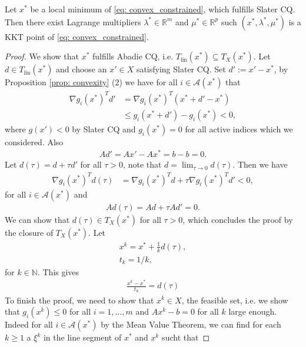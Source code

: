 \begin{theorem}
    Let $ x^{*} $ be a local minimum of \ref{eq: convex_constrained}, which
    fulfills Slater CQ. Then there exist Lagrange multipliers $\lambda^{*}
    \in \mathbb{R}^{m}$ and $\mu^{*} \in \mathbb{R}^{p}$  such
    $(x^{*},\lambda^{*},\mu^{*})$ is a KKT point of \ref{eq:
    convex_constrained}.
\end{theorem}
\begin{proof}
We show that $x^{*}$ fulfills Abadie CQ, i.e. $T_{\text{lin}}(x^{*})
\subseteq T_X(x^{*})$. Let $d \in T_{\text{lin}}(x^{*})$ and choose an $x'
\in X$ satisfying Slater CQ. Set $d' := x' - x^{*}$, by Proposition
\ref{prop: convexity} (2) we have for all $i \in \mathcal{A}(x^{*})$ that
\begin{align}
    \nabla g_i(x^{*})^{T} d'
    &= \nabla g_i(x^{*})^{T} (x^{*} + d' - x^{*} )\\
    &\le g_i(x^{*} +d') -g_i(x^{*}) < 0,
\end{align}
where $g(x') < 0$ by Slater CQ and $g_i(x^{*}) = 0$ for all active indices
which we considered. Also
\begin{align}
    Ad' = Ax' - Ax^{*} = b - b = 0.
\end{align}
Let $d(\tau) = d+ \tau d'$ for all $\tau >0$, note that $d = \lim_{\tau \to
0}d(\tau)$. Then we have
\begin{align}
    \nabla g_i(x^{*})^{T} d(\tau)
    &= \nabla g_i (x^{*})^{T} d + \tau \nabla g_i(x^{*})^{T} d' < 0,
\end{align}
for all $i \in \mathcal{A}(x^{*})$ and
\begin{align}
    Ad(\tau) = Ad + \tau Ad' = 0.
\end{align}
We can show that $d(\tau) \in T_X(x^{*})$ for all $\tau >0 $, which concludes
the proof by the closure of $T_X(x^{*})$. Let
\begin{align}
    x^{k}  = x^{*} + \frac{1}{k}d(\tau),\\
    t_k = 1/k,
\end{align}
for $k \in \mathbb{N}$. This gives
\begin{align}
    \frac{x^{k} - x^{*}  }{t_k} = d(\tau)
\end{align}
To finish the proof, we need to show that $x^{k}  \in X$, the feasible set,
i.e. we show that $g_i(x^{k}) \le 0$ for all $i=1,\ldots,m$ and $Ax^{k} -b =
0$ for all $k$ large enough. Indeed for all $i \in \mathcal{A}(x^{*})$ by the
Mean Value Theorem, we can find for each $k\ge 1$ a $\xi^{k}$ in the line
segment of $x^{*}$ and $x^{k}$ sucht that

\end{proof}
